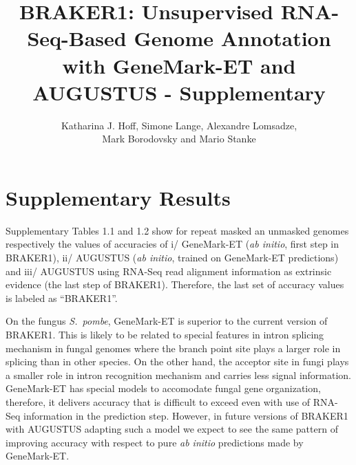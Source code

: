 \documentclass[a4paper,10pt]{report}
\title{BRAKER1: Unsupervised RNA-Seq-Based Genome Annotation with GeneMark-ET and AUGUSTUS - \textbf{Supplementary}}
\author{Katharina J. Hoff, Simone Lange, Alexandre Lomsadze,\\ Mark Borodovsky and Mario Stanke}
\begin{document}
\maketitle

\tableofcontents

\chapter{Supplementary Results}

Supplementary Tables 1.1 and 1.2 show for repeat masked an unmasked genomes respectively the values of accuracies of i/ GeneMark-ET (\textit{ab initio}, first step in BRAKER1), ii/ AUGUSTUS (\textit{ab initio}, trained on GeneMark-ET predictions) and iii/ AUGUSTUS using RNA-Seq read alignment information as extrinsic evidence (the last step of BRAKER1). Therefore, the last set of accuracy values is labeled as ``BRAKER1''.

On the fungus \textit{S.~pombe}, GeneMark-ET is superior to the current version of BRAKER1. This is likely to be related to special features in intron splicing mechanism in fungal genomes where the branch point site plays a larger role in splicing than in other species. On the other hand, the acceptor site in fungi plays a smaller role in intron recognition mechanism and carries less signal information. GeneMark-ET has special models to accomodate fungal gene organization, therefore, it delivers accuracy that is difficult to exceed even with use of RNA-Seq information in the prediction step. However, in future versions of BRAKER1 with AUGUSTUS adapting such a model we expect to see the same pattern of improving accuracy with respect to pure \textit{ab initio} predictions made by GeneMark-ET.
\end{document}
